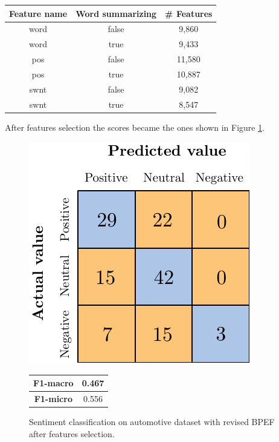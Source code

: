 \begin{center}
	\begin{tabular}{ c  c  c } 
		\hline
		\textbf{Feature name} & \textbf{Word summarizing} & \textbf{\# Features} \\
		\hline
		word & false & 9,860 \\ 
		\hline
		word & true & 9,433 \\ 
		\hline
		pos & false & 11,580 \\ 
		\hline
		pos & true & 10,887 \\ 
		\hline
		swnt & false & 9,082 \\ 
		\hline
		swnt & true & 8,547 \\ 
		\hline
	\end{tabular}
\end{center}

After features selection the scores became the ones shown in Figure \ref{fig:ita_snt_bpef_afs}.

\begin{figure}[H]
	\begin{minipage}[b]{0.6\linewidth}
		\centering
		\includegraphics[scale=1]{figures/conf_matrices/ita_snt_bpef/ita_snt_bpef_afs.pdf}
	\end{minipage}
	\begin{minipage}[b]{0.3\linewidth}
		\begin{tabular}[b]{ | c | c | } 
			\hline
			\textbf{F1-macro} & 0.467 \\
			\hline
			\textbf{F1-micro} & 0.556 \\ 
			\hline
		\end{tabular}
	\end{minipage}
	\caption{Sentiment classification on automotive dataset with revised BPEF after features selection.}
	\label{fig:ita_snt_bpef_afs}
\end{figure}


